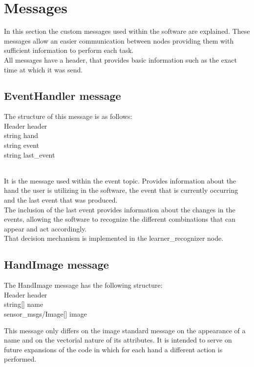 \section{Messages}
\label{messages}

In this section the custom messages used within the software are explained. These messages allow an easier communication between nodes providing them with sufficient information to perform each task. 
\\

All messages have a header, that provides basic information such as the exact time at which it was send. 


\subsection{EventHandler message}
The structure of this message is as follows: \\

Header header\\
string hand\\
string event\\
string last\_event

\\

It is the message used within the event topic. Provides information about the hand the user is utilizing in the software, the event that is currently occurring and the last event that was produced. 
\\

The inclusion of the last event provides information about the changes in the events, allowing the software to recognize the different combinations that can appear and act accordingly. 
\\

That decision mechanism is implemented in the learner\_recognizer node. 

\subsection{HandImage message}

The HandImage message has the following structure: \\
Header header\\
string[] name\\
sensor\_msgs/Image[] image

This message only differs on the image standard message on the appearance of a name and on the vectorial nature of its attributes. It is intended to serve on future expansions of the code in which for each hand a different action is performed. 

